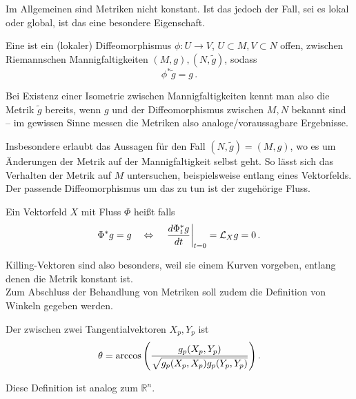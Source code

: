 \documentclass[../H_Analysis_main.tex]{subfiles}
\begin{document}
Im Allgemeinen sind Metriken nicht konstant. Ist das jedoch der Fall, sei es lokal oder global, ist das eine besondere Eigenschaft.

\begin{defi}[Isometrie]
Eine  ist ein (lokaler) Diffeomorphismus $\phi: U \rightarrow V$, $U \subset M, V \subset N$ offen, zwischen Riemannschen Mannigfaltigkeiten $(M, g), (N, \tilde{g})$, sodass
\begin{equation}
\phi^* \tilde{g} = g \, .
\end{equation}
\end{defi}

Bei Existenz einer Isometrie zwischen Mannigfaltigkeiten kennt man also die Metrik $\tilde{g}$ bereits, wenn $g$ und der Diffeomorphismus zwischen $M, N$ bekannt sind -- im gewissen Sinne messen die Metriken also analoge/voraussagbare Ergebnisse.


Insbesondere erlaubt das Aussagen für den Fall $(N, \tilde{g}) = (M, g)$, wo es um Änderungen der Metrik auf der Mannigfaltigkeit selbst geht. So lässt sich das Verhalten der Metrik auf $M$ untersuchen, beispielsweise entlang eines Vektorfelds. Der passende Diffeomorphismus um das zu tun ist der zugehörige Fluss.

\begin{defi}
Ein Vektorfeld $X$ mit Fluss $\Phi$ heißt  falls
\begin{equation}
\Phi^* g = g \quad \Leftrightarrow \quad \eval{\dv{\Phi_t^* g}{t}}_{t = 0} = \mathcal{L}_X g = 0 \, .
\end{equation}
\end{defi}

Killing-Vektoren sind also besonders, weil sie einem Kurven vorgeben, entlang denen die Metrik konstant ist.\\



Zum Abschluss der Behandlung von Metriken soll zudem die Definition von Winkeln gegeben werden.
\begin{defi}[Winkel]
Der  zwischen zwei Tangentialvektoren $X_p, Y_p$ ist
\begin{equation}
\theta = \arccos\qty(\frac{g_p(X_p, Y_p)}{\sqrt{g_p(X_p, X_p) g_p(Y_p, Y_p)}}) \, .
\end{equation}
\end{defi}

Diese Definition ist analog zum $\mathbb{R}^n$.
\end{document}
